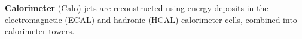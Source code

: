 {\bf Calorimeter} (Calo) jets 
are reconstructed using energy deposits in the electromagnetic (ECAL) 
and hadronic (HCAL)
calorimeter cells, combined into calorimeter towers. 


